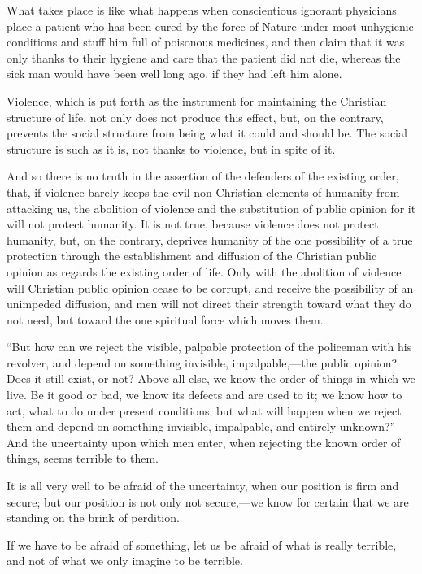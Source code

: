 \documentclass{book}
\begin{document}
What takes place is like what happens when conscientious ignorant physicians place a patient who has been cured by the force of Nature under most unhygienic conditions and stuff him full of poisonous medicines, and then claim that it was only thanks to their hygiene and care that the patient did not die, whereas the sick man would have been well long ago, if they had left him alone.

Violence, which is put forth as the instrument for maintaining the Christian structure of life, not only does not produce this effect, but, on the contrary, prevents the social structure from being what it could and should be. The social structure is such as it is, not thanks to violence, but in spite of it.

And so there is no truth in the assertion of the defenders of the existing order, that, if violence barely keeps the evil non-Christian elements of humanity from attacking us, the abolition of violence and the substitution of public opinion for it will not protect humanity. It is not true, because violence does not protect humanity, but, on the contrary, deprives humanity of the one possibility of a true protection through the establishment and diffusion of the Christian public opinion as regards the existing order of life. Only with the abolition of violence will Christian public opinion cease to be corrupt, and receive the possibility of an unimpeded diffusion, and men will not direct their strength toward what they do not need, but toward the one spiritual force which moves them.

“But how can we reject the visible, palpable protection of the policeman with his revolver, and depend on something invisible, impalpable,—the public opinion? Does it still exist, or not? Above all else, we know the order of things in which we live. Be it good or bad, we know its defects and are used to it; we know how to act, what to do under present conditions; but what will happen when we reject them and depend on something invisible, impalpable, and entirely unknown?” And the uncertainty upon which men enter, when rejecting the known order of things, seems terrible to them.

It is all very well to be afraid of the uncertainty, when our position is firm and secure; but our position is not only not secure,—we know for certain that we are standing on the brink of perdition.

If we have to be afraid of something, let us be afraid of what is really terrible, and not of what we only imagine to be terrible.
\end{document}
